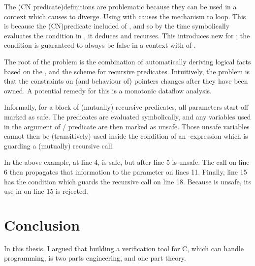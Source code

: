
The \kl(CN predicate){definitions} are problematic because they can be used in a context which
causes  to diverge. Using  %
with  causes the  mechanism to loop. %
This is because the  \kl(CN){predicate} included  of
, and so by the time  symbolically evaluates the
condition in , it deduces
 and recurses. This introduces new %
 for ; the condition is guaranteed to always be
false in a context with  of .

The root of the problem is the combination of automatically deriving logical
facts based on the , and the  scheme for
recursive predicates. Intuitively, the problem is that the constraints on (and
behaviour of) pointers changes after they have been owned. A potential remedy
for this is a monotonic dataflow analysis.

Informally, for a block of (mutually) recursive predicates, all parameters
start off marked as safe. The predicates are evaluated symbolically, and any
variables used in the argument of / predicate are then
marked as unsafe. Those unsafe variables cannot then be (transitively) used
inside the condition of an -expression which is guarding a
(mutually) recursive call.

In the above example, at line 4,  is safe, but after line 5
 is unsafe. The call on line 6 then propagates that information
to the parameter on lines 11. Finally, line 15 has the condition which guards
the recursive call on line 18. Because  is unsafe, its use in
on line 15 is rejected.

\chapter{Conclusion}%
\label{chap:conclusion}

\margintoc{}

In this thesis, I argued that building a verification tool for C, which can
handle  programming, is two parts engineering, and one part theory.

